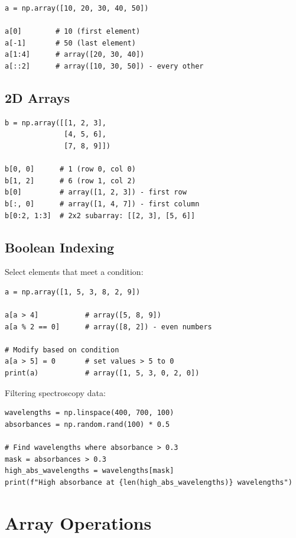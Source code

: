 \begin{lstlisting}
a = np.array([10, 20, 30, 40, 50])

a[0]        # 10 (first element)
a[-1]       # 50 (last element)
a[1:4]      # array([20, 30, 40])
a[::2]      # array([10, 30, 50]) - every other
\end{lstlisting}

\subsection{2D Arrays}

\begin{lstlisting}
b = np.array([[1, 2, 3],
              [4, 5, 6],
              [7, 8, 9]])

b[0, 0]      # 1 (row 0, col 0)
b[1, 2]      # 6 (row 1, col 2)
b[0]         # array([1, 2, 3]) - first row
b[:, 0]      # array([1, 4, 7]) - first column
b[0:2, 1:3]  # 2x2 subarray: [[2, 3], [5, 6]]
\end{lstlisting}

\subsection{Boolean Indexing}

Select elements that meet a condition:

\begin{lstlisting}
a = np.array([1, 5, 3, 8, 2, 9])

a[a > 4]           # array([5, 8, 9])
a[a % 2 == 0]      # array([8, 2]) - even numbers

# Modify based on condition
a[a > 5] = 0       # set values > 5 to 0
print(a)           # array([1, 5, 3, 0, 2, 0])
\end{lstlisting}

\begin{labexample}
Filtering spectroscopy data:

\begin{lstlisting}
wavelengths = np.linspace(400, 700, 100)
absorbances = np.random.rand(100) * 0.5

# Find wavelengths where absorbance > 0.3
mask = absorbances > 0.3
high_abs_wavelengths = wavelengths[mask]
print(f"High absorbance at {len(high_abs_wavelengths)} wavelengths")
\end{lstlisting}
\end{labexample}

\section{Array Operations}
\label{sec:array-operations}

